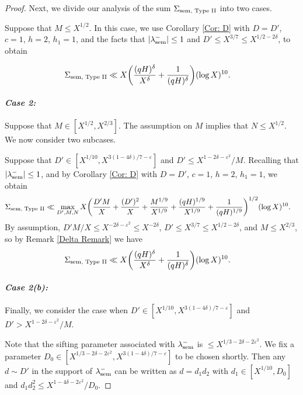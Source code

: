 \documentclass[12pt]{amsart}
\numberwithin{equation}{section}
\theoremstyle{remark}
\theoremstyle{definition}
\begin{document}
\begin{proof}
Next, we divide our analysis of the sum $\Sigma_{ \textup{sem, Type II}}$ into two cases. 

 Suppose that $M\leq X^{1/2}$. In this case, we use Corollary \ref{Cor: D} with $D=D'$, $c=1$, $h=2$, $h_1=1$, and the facts that $|\lambda_{\textup{sem}}^-|\leq 1$ and $D'\leq X^{3/7} \leq X^{1/2-2\delta}$, to obtain

\begin{align}\notag 
\Sigma_{ \textup{sem, Type II}}  & \ll  X\bigg(\dfrac{(qH)^\delta}{X^\delta} + \dfrac{1}{(qH)^\delta}\bigg)(\log X)^{10}.
\end{align}


\paragraph{\it Case 2:} Suppose that $M\in [X^{1/2}, X^{2/3}]$. The assumption on $M$ implies that $N\leq X^{1/2}$. We now consider two subcases.

 Suppose that $D' \in [X^{1/10}, X^{3(1-4\delta)/7-\varepsilon}]$ and $D' \leq X^{1-2\delta-\varepsilon^2}/M$. Recalling that $|\lambda_{\textup{sem}}^-|\leq 1$, and by Corollary \ref{Cor: D} with $D=D'$, $c=1$, $h=2$, $h_1=1$,  we obtain
\begin{align}
\notag \Sigma_{ \textup{sem, Type II}} & \ll \max_{D', M, N}X\bigg(\dfrac{D'M}{X}+ \dfrac{(D')^2}{X} +\dfrac{M^{1/9}}{X^{1/9}} + \dfrac{(qH)^{1/9}}{X^{1/9}} + \dfrac{1}{(qH)^{1/9}}\bigg)^{1/2}(\log X)^{10}.
\end{align}
By assumption, $D'M/X \leq X^{-2\delta-\varepsilon^2} \leq  X^{-2\delta}$, $D'\leq X^{3/7} \leq X^{1/2-2\delta}$, and $M\leq X^{2/3}$, so by Remark \ref{Delta Remark} we have
\begin{align}
 \notag \Sigma_{ \textup{sem, Type II}} &\ll  X\bigg(\dfrac{(qH)^\delta}{X^\delta} + \dfrac{1}{(qH)^\delta}\bigg)(\log X)^{10}.
\end{align}

\paragraph{\it Case 2(b):} Finally, we consider the case when $D' \in [X^{1/10}, X^{3(1-4\delta)/7-\varepsilon}]$ and $D' >X^{1-2\delta-\varepsilon^2}/M$. 
 
Note that the sifting parameter associated with $\lambda_{\textup{sem}}^-$ is $\leq X^{1/3-2\delta-2\varepsilon^2}$. We fix a parameter $D_0 \in [X^{1/3-2\delta-2\varepsilon^2}, X^{3(1-4\delta)/7-\varepsilon}]$ to be chosen shortly. Then any $d\sim D'$ in the support of $\lambda_{\textup{sem}}^-$ can be written as $d=d_1d_2$ with $d_1\in [X^{1/10}, D_0]$ and $d_1d_2^2\leq X^{1-4\delta-2\varepsilon^2}/D_0$. 
 

\end{proof}
\end{document}
